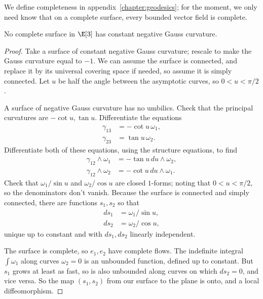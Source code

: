 We define completeness in appendix~\ref{chapter:geodesics}; for the moment, we only need know that on a complete surface, every bounded vector field is complete. 
\begin{theorem}[Hilbert]
No complete surface in \(\E[3]\) has constant negative Gauss curvature.
\end{theorem}
\begin{proof}
Take a surface of constant negative Gauss curvature; rescale to make the Gauss curvature equal to \(-1\).
We can assume the surface is connected, and replace it by its universal covering space if needed, so assume it is simply connected.
Let \(u\) be half the angle between the asymptotic curves, so \(0<u<\pi/2\).
\begin{center}

\end{center}
A surface of negative Gauss curvature has no umbilics.
Check that the principal curvatures are \(-\cot u,\tan u\).
Differentiate the equations 
\begin{align*}
\gamma_{13}&=-\cot u \, \omega_1,\\
\gamma_{23}&=\tan u \, \omega_2.
\end{align*}
Differentiate both of these equations, using the structure equations, to find
\begin{align*}
\gamma_{12}\wedge\omega_1&=-\tan u \, du \wedge \omega_2,\\
\gamma_{12}\wedge\omega_2&=-\cot u \, du \wedge \omega_1.
\end{align*}
Check that \(\omega_1/\sin u\) and \(\omega_2/\cos u\) are closed \(1\)-forms; noting that \(0 < u < \pi/2\), so the denominators don't vanish.
Because the surface is connected and simply connected, there are functions \(s_1,s_2\) so that 
\begin{align*}
ds_1&=\omega_1/\sin u,\\
ds_2&=\omega_2/\cos u,
\end{align*}
unique up to constant and with \(ds_1,ds_2\) linearly independent.

The surface is complete, so \(e_1,e_2\) have complete flows.
The indefinite integral \(\int \omega_1\) along curves \(\omega_2=0\) is an unbounded function, defined up to constant.
But \(s_1\) grows at least as fast, so is also unbounded along curves on which \(ds_2=0\), and vice versa.
So the map \((s_1,s_2)\) from our surface to the plane is onto, and a local diffeomorphism.


\end{proof}
